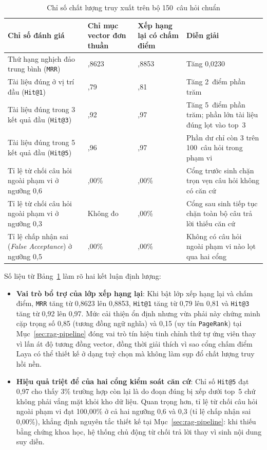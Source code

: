 \begin{table}[htbp]
\centering
\caption{Chỉ số chất lượng truy xuất trên bộ 150~câu hỏi chuẩn}
\label{tab:chat-luong-truy-xuat}
\small
\begin{tabularx}{\textwidth}{
  >{\raggedright\arraybackslash}p{4.8cm}
  >{\raggedleft\arraybackslash}p{2.3cm}
  >{\raggedleft\arraybackslash}p{2.3cm}
  >{\raggedright\arraybackslash}X
}
\toprule
\textbf{Chỉ số đánh giá} & \textbf{Chỉ mục vector đơn thuần} & \textbf{Xếp hạng lại có chấm điểm} & \textbf{Diễn giải} \\
\midrule
Thứ hạng nghịch đảo trung bình (\texttt{MRR}) & 0,8623 & 0,8853 & Tăng 0,0230 \\
\midrule
Tài liệu đúng ở vị trí đầu (\texttt{Hit@1}) & 0,79 & 0,81 & Tăng 2~điểm phần trăm \\
\midrule
Tài liệu đúng trong 3 kết quả đầu (\texttt{Hit@3}) & 0,92 & 0,97 & Tăng 5~điểm phần trăm; phần lớn tài liệu đúng lọt vào top~3 \\
\midrule
Tài liệu đúng trong 5 kết quả đầu (\texttt{Hit@5}) & 0,96 & 0,97 & Phần dư chỉ còn 3 trên 100~câu hỏi trong phạm vi \\
\midrule
Tỉ lệ từ chối câu hỏi ngoài phạm vi ở ngưỡng 0,6 & 100,00\% & 100,00\% & Cổng trước sinh chặn trọn vẹn câu hỏi không có căn cứ \\
\midrule
Tỉ lệ từ chối câu hỏi ngoài phạm vi ở ngưỡng 0,3 & Không đo & 100,00\% & Cổng sau sinh tiếp tục chặn toàn bộ câu trả lời thiếu căn cứ \\
\midrule
Tỉ lệ chấp nhận sai (\textit{False Acceptance}) ở ngưỡng 0,5 & 0,00\% & 0,00\% & Không có câu hỏi ngoài phạm vi nào lọt qua hai cổng \\
\bottomrule
\end{tabularx}
\end{table}

Số liệu từ Bảng~\ref{tab:chat-luong-truy-xuat} làm rõ hai kết luận định lượng:

\begin{itemize}
\item[--] \textbf{Vai trò bổ trợ của lớp xếp hạng lại}: Khi bật lớp xếp hạng lại và chấm điểm, \texttt{MRR} tăng từ 0,8623 lên 0,8853, \texttt{Hit@1} tăng từ 0,79 lên 0,81 và \texttt{Hit@3} tăng từ 0,92 lên 0,97. Mức cải thiện ổn định nhưng vừa phải này chứng minh cặp trọng số 0,85 (tương đồng ngữ nghĩa) và 0,15 (uy tín \texttt{PageRank}) tại Mục~\ref{sec:rag-pipeline} đóng vai trò tín hiệu tinh chỉnh thứ tự ứng viên thay vì lấn át độ tương đồng vector, đồng thời giải thích vì sao cổng chấm điểm Laya có thể thiết kế ở dạng tuỳ chọn mà không làm sụp đổ chất lượng truy hồi nền.
\item[--] \textbf{Hiệu quả triệt để của hai cổng kiểm soát căn cứ}: Chỉ số \texttt{Hit@5} đạt 0,97 cho thấy 3\% trường hợp còn lại là do đoạn đúng bị xếp dưới top~5 chứ không phải vắng mặt khỏi kho dữ liệu. Quan trọng hơn, tỉ lệ từ chối câu hỏi ngoài phạm vi đạt 100,00\% ở cả hai ngưỡng 0,6 và 0,3 (tỉ lệ chấp nhận sai 0,00\%), khẳng định nguyên tắc thiết kế tại Mục~\ref{sec:rag-pipeline}: khi thiếu bằng chứng khoa học, hệ thống chủ động từ chối trả lời thay vì sinh nội dung suy diễn.
\end{itemize}

